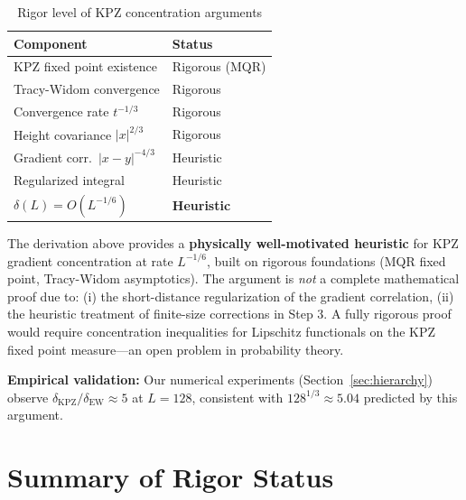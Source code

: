 \documentclass[aps,pre,reprint,amsmath,amssymb,superscriptaddress]{revtex4-2}
\newcommand{\EW}{\text{EW}}
\newcommand{\KPZ}{\text{KPZ}}
\begin{document}
\begin{table}[h]
\centering
\caption{Rigor level of KPZ concentration arguments}
\footnotesize
\begin{tabular}{@{}ll@{}}
\toprule
Component & Status \\
\midrule
KPZ fixed point existence & Rigorous (MQR) \\
Tracy-Widom convergence & Rigorous \\
Convergence rate $t^{-1/3}$ & Rigorous \\
Height covariance $|x|^{2/3}$ & Rigorous \\
Gradient corr.~$|x-y|^{-4/3}$ & Heuristic \\
Regularized integral & Heuristic \\
$\delta(L) = O(L^{-1/6})$ & \textbf{Heuristic} \\
\bottomrule
\end{tabular}
\end{table}

The derivation above provides a \textbf{physically well-motivated heuristic} for KPZ gradient concentration at rate $L^{-1/6}$, built on rigorous foundations (MQR fixed point, Tracy-Widom asymptotics). The argument is \textit{not} a complete mathematical proof due to: (i) the short-distance regularization of the gradient correlation, (ii) the heuristic treatment of finite-size corrections in Step 3. A fully rigorous proof would require concentration inequalities for Lipschitz functionals on the KPZ fixed point measure---an open problem in probability theory.

\textbf{Empirical validation:} Our numerical experiments (Section~\ref{sec:hierarchy}) observe $\delta_{\KPZ}/\delta_{\EW} \approx 5$ at $L=128$, consistent with $128^{1/3} \approx 5.04$ predicted by this argument.

\section{Summary of Rigor Status}
\label{app:rigor}
\end{document}
